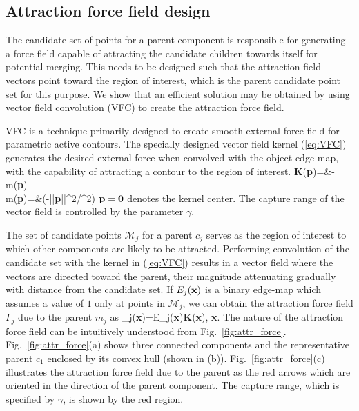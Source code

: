 \subsection{Attraction force field design}
The candidate set of points for a parent component is responsible for generating a force field capable of attracting the candidate children towards itself for potential merging. This needs to be designed such that the attraction field vectors point toward the region of interest, which is the parent candidate point set for this purpose. We show that an efficient solution may be obtained by using vector field convolution (VFC) to create the attraction force field.

VFC \cite{li_VFC} is a technique primarily designed to create smooth external force field for parametric active contours. The specially designed vector field kernel (\ref{eq:VFC}) generates the desired external force when convolved with the object edge map, with the capability of attracting a contour to the region of interest.
\bea
	\textbf{K}(\textbf{p})=&-m(\textbf{p}) \nn\\
	m(\textbf{p})=&\exp(-||\textbf{p}||^{2}/\gamma^{2})
	\label{eq:VFC}
\eea
$\textbf{p}=\bf 0$ denotes the kernel center. The capture range of the vector field is controlled by the parameter $\gamma$. 

The set of candidate points $\mathcal{M}_j$ for a parent $c_j$ serves as the region of interest to which other components are likely to be attracted. Performing convolution of the candidate set with the kernel in (\ref{eq:VFC})  results in a vector field where the vectors are directed toward the parent, their magnitude attenuating gradually with distance from the candidate set.
If $E_j(\bf x)$ is a binary edge-map which assumes a value of $1$ only at points in $\mathcal{M}_j$, we can obtain the attraction force field  $\Gamma_j$ due to the parent $m_j$ as
\bea
\label{eq:Attr_Field}
\Gamma_j(\textbf{x})=E_j(\textbf{x})\ast \textbf{K}(\textbf{x}), \quad \forall \textbf{x}\in \Omega.
\eea
The nature of the attraction force field can be intuitively understood from Fig.~\ref{fig:attr_force}. Fig.~\ref{fig:attr_force}(a)  shows three connected components and the representative parent $c_1$ enclosed by its convex hull (shown in (b)). Fig.~\ref{fig:attr_force}(c) illustrates the attraction force field due to the parent as the red arrows which are oriented in the direction of the parent component. The capture range, which is specified by $\gamma$, is shown by the red region. 

